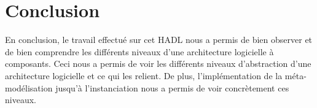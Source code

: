 \documentclass[11pt,a4paper]{article}
\begin{document}
\section{Conclusion}

En conclusion, le travail effectué sur cet HADL nous a permis de bien observer
et de bien comprendre les différents niveaux d'une architecture logicielle à
composants. Ceci nous a permis de voir les différents niveaux d'abstraction
d'une architecture logicielle et ce qui les relient. De plus, l'implémentation
de la méta-modélisation jusqu'à l'instanciation nous a permis de voir
concrètement ces niveaux.
\end{document}
